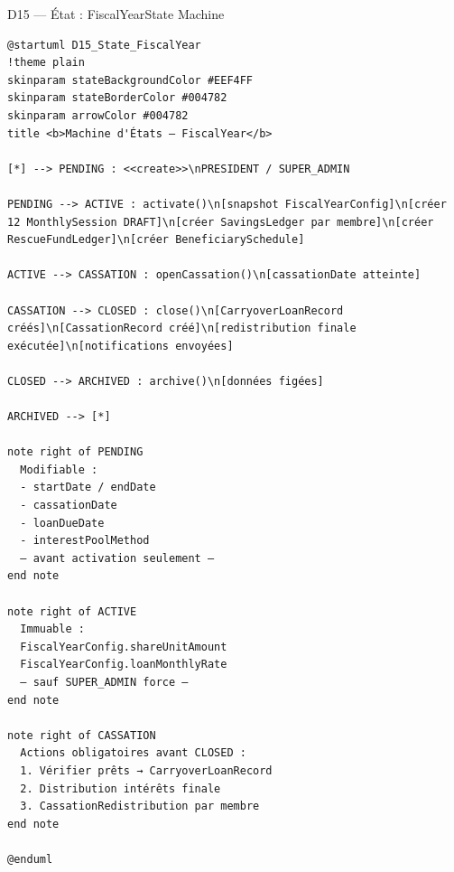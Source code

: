\documentclass[12pt, a4paper]{report}
\begin{document}
\begin{diagramBox}{D15 — État : FiscalYear}{State Machine}
\begin{lstlisting}
@startuml D15_State_FiscalYear
!theme plain
skinparam stateBackgroundColor #EEF4FF
skinparam stateBorderColor #004782
skinparam arrowColor #004782
title <b>Machine d'États — FiscalYear</b>

[*] --> PENDING : <<create>>\nPRESIDENT / SUPER_ADMIN

PENDING --> ACTIVE : activate()\n[snapshot FiscalYearConfig]\n[créer 12 MonthlySession DRAFT]\n[créer SavingsLedger par membre]\n[créer RescueFundLedger]\n[créer BeneficiarySchedule]

ACTIVE --> CASSATION : openCassation()\n[cassationDate atteinte]

CASSATION --> CLOSED : close()\n[CarryoverLoanRecord créés]\n[CassationRecord créé]\n[redistribution finale exécutée]\n[notifications envoyées]

CLOSED --> ARCHIVED : archive()\n[données figées]

ARCHIVED --> [*]

note right of PENDING
  Modifiable :
  - startDate / endDate
  - cassationDate
  - loanDueDate
  - interestPoolMethod
  — avant activation seulement —
end note

note right of ACTIVE
  Immuable :
  FiscalYearConfig.shareUnitAmount
  FiscalYearConfig.loanMonthlyRate
  — sauf SUPER_ADMIN force —
end note

note right of CASSATION
  Actions obligatoires avant CLOSED :
  1. Vérifier prêts → CarryoverLoanRecord
  2. Distribution intérêts finale
  3. CassationRedistribution par membre
end note

@enduml
\end{lstlisting}
\end{diagramBox}
\end{document}

